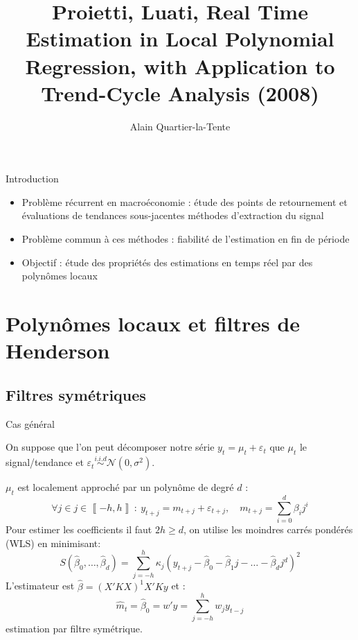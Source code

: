 \documentclass[10pt,xcolor=table,color={dvipsnames,usenames},ignorenonframetext,usepdftitle=false,french]{beamer}
\title{Proietti, Luati, Real Time Estimation in Local Polynomial Regression,
with Application to Trend-Cycle Analysis (2008)}
\author{Alain Quartier-la-Tente}
\date{}
\begin{document}
\begin{frame}
\titlepage
\end{frame}

\begin{frame}{Introduction}
\protect\hypertarget{introduction}{}

\begin{itemize}
\item
  Problème récurrent en macroéconomie : étude des points de retournement
  et évaluations de tendances sous-jacentes \faArrowCircleRight{}
  méthodes d'extraction du signal
\item
  Problème commun à ces méthodes : fiabilité de l'estimation en fin de
  période
\item
  Objectif : étude des propriétés des estimations en temps réel par des
  polynômes locaux
\end{itemize}

\end{frame}

\hypertarget{polynuxf4mes-locaux-et-filtres-de-henderson}{%
\section{Polynômes locaux et filtres de
Henderson}\label{polynuxf4mes-locaux-et-filtres-de-henderson}}

\hypertarget{filtres-symuxe9triques}{%
\subsection{Filtres symétriques}\label{filtres-symuxe9triques}}

\begin{frame}{Cas général}
\protect\hypertarget{cas-guxe9nuxe9ral}{}

On suppose que l'on peut décomposer notre série
\(y_t=\mu_t+\varepsilon_t\) que \(\mu_t\) le signal/tendance et
\(\varepsilon_t\overset{i.i.d}{\sim}\mathcal N(0,\sigma^2)\).

\(\mu_t\) est localement approché par un polynôme de degré \(d\) : \[
\forall j\in j\in\left\llbracket -h,h\right\rrbracket \::\: y_{t+j}=m_{t+j}+\varepsilon_{t+j},\quad m_{t+j}=\sum_{i=0}^{d}\beta_{i}j^{i}
\] \pause Pour estimer les coefficients il faut \(2h \geq d\), on
utilise les moindres carrés pondérés (WLS) en minimisant: \[
S(\hat{\beta}_{0},\dots,\hat{\beta}_{d})=\sum_{j=-h}^{h}\kappa_{j}(y_{t+j}-\hat{\beta}_{0}-\hat{\beta}_{1}j-\dots-\hat{\beta}_{d}j^{d})^{2}
\] \pause L'estimateur est \(\hat{\beta}=(X'KX)^{1}X'Ky\) et : \[
\hat{m}_{t}=\hat\beta_0=w'y=\sum_{j=-h}^{h}w_{j}y_{t-j}
\] \faArrowCircleRight{} estimation par filtre symétrique.

\end{frame}
\end{document}
